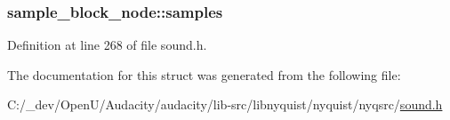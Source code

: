 \subsubsection[{\texorpdfstring{samples}{samples}}]{ sample\+\_\+block\+\_\+node\+::samples}\hypertarget{structsample__block__node_a921e4cd2359010f8ed736a116da8867e}{}\label{structsample__block__node_a921e4cd2359010f8ed736a116da8867e}


Definition at line 268 of file sound.\+h.



The documentation for this struct was generated from the following file\+:\begin{DoxyCompactItemize}
\item 
C\+:/\+\_\+dev/\+Open\+U/\+Audacity/audacity/lib-\/src/libnyquist/nyquist/nyqsrc/\hyperlink{sound_8h}{sound.\+h}\end{DoxyCompactItemize}
